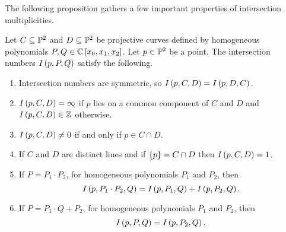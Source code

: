The following proposition gathers a few important properties of intersection multiplicities.

\begin{proposition}
\label{prop:12.5}
Let $ C \subseteq \P^2 $ and $ D \subseteq \P^2 $ be projective curves defined by homogeneous polynomials $ P, Q \in \C\sb{x_0, x_1, x_2} $. Let $ p \in \P^2 $ be a point. The intersection numbers $ I\rb{p, P, Q} $ satisfy the following.
\begin{enumerate}
\item Intersection numbers are symmetric, so $ I\rb{p, C, D} = I\rb{p, D, C} $.
\item $ I\rb{p, C, D} = \infty $ if $ p $ lies on a common component of $ C $ and $ D $ and $ I\rb{p, C, D} \in \Z $ otherwise.
\item $ I\rb{p, C, D} \ne 0 $ if and only if $ p \in C \cap D $.
\item If $ C $ and $ D $ are distinct lines and if $ \cb{p} = C \cap D $ then $ I\rb{p, C, D} = 1 $.
\item If $ P = P_1 \cdot P_2 $, for homogeneous polynomials $ P_1 $ and $ P_2 $, then
$$ I\rb{p, P_1 \cdot P_2, Q} = I\rb{p, P_1, Q} + I\rb{p, P_2, Q}. $$
\item If $ P = P_1 \cdot Q + P_2 $, for homogeneous polynomials $ P_1 $ and $ P_2 $, then
$$ I\rb{p, P, Q} = I\rb{p, P_2, Q}. $$
\end{enumerate}
\end{proposition}

